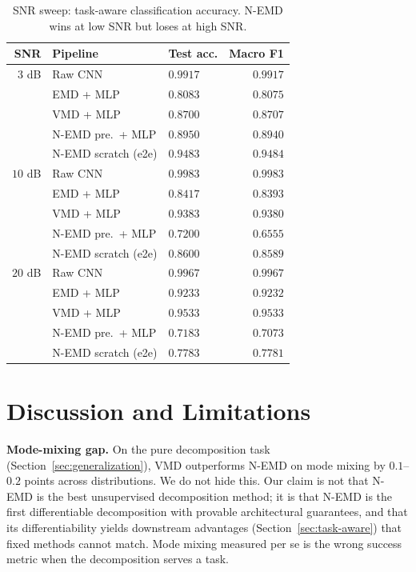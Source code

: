 \documentclass[journal]{IEEEtran}
\begin{document}
\begin{table}[t]
\centering
\caption{SNR sweep: task-aware classification accuracy. N-EMD wins at low SNR but loses at high SNR.}
\label{tab:snr-sweep}
\begin{tabular}{rllr}
\toprule
SNR & Pipeline & Test acc. & Macro F1 \\
\midrule
$3$ dB  & Raw CNN              & $0.9917$ & $0.9917$ \\
        & EMD + MLP            & $0.8083$ & $0.8075$ \\
        & VMD + MLP            & $0.8700$ & $0.8707$ \\
        & N-EMD pre.\ + MLP    & $0.8950$ & $0.8940$ \\
        & N-EMD scratch (e2e)  & $\mathbf{0.9483}$ & $\mathbf{0.9484}$ \\
\midrule
$10$ dB & Raw CNN              & $0.9983$ & $0.9983$ \\
        & EMD + MLP            & $0.8417$ & $0.8393$ \\
        & VMD + MLP            & $\mathbf{0.9383}$ & $\mathbf{0.9380}$ \\
        & N-EMD pre.\ + MLP    & $0.7200$ & $0.6555$ \\
        & N-EMD scratch (e2e)  & $0.8600$ & $0.8589$ \\
\midrule
$20$ dB & Raw CNN              & $0.9967$ & $0.9967$ \\
        & EMD + MLP            & $0.9233$ & $0.9232$ \\
        & VMD + MLP            & $\mathbf{0.9533}$ & $\mathbf{0.9533}$ \\
        & N-EMD pre.\ + MLP    & $0.7183$ & $0.7073$ \\
        & N-EMD scratch (e2e)  & $0.7783$ & $0.7781$ \\
\bottomrule
\end{tabular}
\end{table}

\section{Discussion and Limitations}
\label{sec:discussion}

\textbf{Mode-mixing gap.} On the pure decomposition task (Section~\ref{sec:generalization}), VMD outperforms N-EMD on mode mixing by $0.1$--$0.2$ points across distributions. We do not hide this. Our claim is not that N-EMD is the best unsupervised decomposition method; it is that N-EMD is the first differentiable decomposition with provable architectural guarantees, and that its differentiability yields downstream advantages (Section~\ref{sec:task-aware}) that fixed methods cannot match. Mode mixing measured per se is the wrong success metric when the decomposition serves a task.
\end{document}
